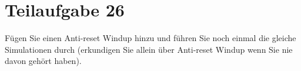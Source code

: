 \section{Teilaufgabe 26}
\begin{aufgabe}
Fügen Sie einen Anti-reset Windup hinzu und führen Sie noch einmal die gleiche 
Simulationen durch (erkundigen Sie allein über Anti-reset Windup wenn Sie nie 
davon gehört haben).
\end{aufgabe}

